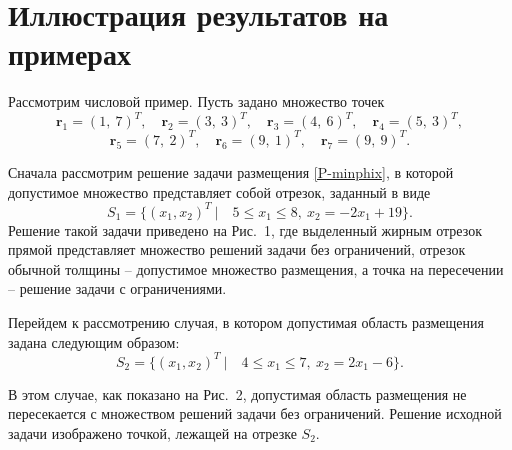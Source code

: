 \documentclass{spisok-article}
\begin{document}
\section{Иллюстрация результатов на примерах}

Рассмотрим числовой пример. Пусть задано множество точек 
\begin{equation*}
\bm{r}_{1} = (1,\ 7)^{T}, \quad \bm{r}_{2} = (3,\ 3)^{T}, \quad \bm{r}_{3} = (4,\ 6)^{T}, \quad \bm{r}_{4} = (5,\ 3)^{T},
\end{equation*}
\begin{equation*}
\bm{r}_{5} = (7,\ 2)^{T}, \quad \bm{r}_{6} = (9,\ 1)^{T}, \quad \bm{r}_{7} = (9,\ 9)^{T}.
\end{equation*}

Сначала рассмотрим решение задачи размещения \eqref{P-minphix}, в которой допустимое множество представляет собой отрезок, заданный в виде 
\begin{equation*}
S_{1}
=
\{(x_{1},x_{2})^{T}\ | \quad 5\leq x_{1}\leq 8,\ x_{2}=-2x_{1}+19\}.
\end{equation*}
Решение такой задачи приведено на Рис.~1, где выделенный жирным отрезок прямой представляет множество решений задачи без ограничений, отрезок обычной толщины -- допустимое множество размещения, а точка на пересечении -- решение задачи с ограничениями.

Перейдем к рассмотрению случая, в котором допустимая область размещения задана следующим образом:
\begin{equation*}
S_{2}
=
\{(x_{1},x_{2})^{T}\ | \quad 4\leq x_{1}\leq 7,\ x_{2}=2x_{1}-6\}.
\end{equation*}

В этом случае, как показано на Рис.~2, допустимая область размещения не пересекается с множеством решений задачи без ограничений. Решение исходной задачи изображено точкой, лежащей на отрезке $S_{2}$.
\end{document}
